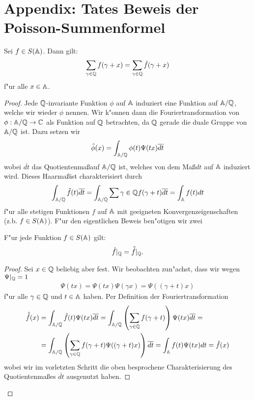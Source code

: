 \section{Appendix: Tates Beweis der Poisson-Summenformel}
\begin{satz}
		Sei $f \in S(\mathbb{A})$. Dann gilt:
		\begin{align}
			\sum_{\gamma \in \mathbb{Q}} {f(\gamma + x)} = \sum_{\gamma \in \mathbb{Q}}{\hat{f}(\gamma + x)}
		\end{align}
		f"ur alle $x \in \mathbb{A}$.
	\end{satz}
	\begin{proof}
		Jede $\mathbb{Q}$-invariante Funktion $\phi$ auf $\mathbb{A}$ induziert eine Funktion auf $\mathbb{A}/\mathbb{Q}$, welche wir wieder $\phi$ nennen.
		Wir k"onnen dann die Fouriertransformation von $\phi: \mathbb{A}/\mathbb{Q} \rightarrow \mathbb{C}$ als Funktion auf $\mathbb{Q}$ betrachten, da $\mathbb{Q}$ gerade die duale Gruppe von $\mathbb{A}/\mathbb{Q}$ ist. Dazu setzen wir
		\begin{align*}
			\hat{\phi}(x) = \int_{\mathbb{A}/\mathbb{Q}}\phi(t)\Psi(tx)\overline{dt}
		\end{align*}
		wobei $\overline{dt}$ das Quotientenma\ss auf $\mathbb{A}/\mathbb{Q}$ ist, welches von dem Ma\ss $dt$ auf $\mathbb{A}$ induziert wird. Dieses Haarma\ss ist charakterisiert durch
		\begin{align*}
			\int_{\mathbb{A}/\mathbb{Q}}\tilde{f}(t)\overline{dt} =
			\int_{\mathbb{A}/\mathbb{Q}}\sum{\gamma \in \mathbb{Q}}f(\gamma+t)\overline{dt} =
			\int_{\mathbb{A}} f(t)dt
		\end{align*}
		f"ur alle stetigen Funktionen $f$ auf $\mathbb{A}$ mit geeigneten Konvergenzeigenschaften (z.b. $f\in S(\mathbb{A})$). F"ur den eigentlichen Beweis ben"otigen wir zwei
		
		\begin{lemma}
			F"ur jede Funktion $f \in S(\mathbb{A})$ gilt:
			\begin{align*}
				\hat{f}|_{\mathbb{Q}} = \hat{\tilde{f}}|_{\mathbb{Q}}.
			\end{align*}
		\end{lemma}
		\begin{proof}
			Sei $x \in \mathbb{Q}$ beliebig aber fest. Wir beobachten zun"achst, dass wir wegen $\Psi|_{\mathbb{Q}} =1$
			\begin{align*}
				\Psi(tx)= \Psi(tx)\Psi(\gamma x)=\Psi((\gamma + t) x)
			\end{align*}
			f"ur alle $\gamma \in \mathbb{Q}$ und $t\in \mathbb{A}$ haben. Per Definition der Fouriertransformation
			\begin{align*}
				\hat{\tilde{f}}(x)	&= \int_{\mathbb{A} / \mathbb{Q}} {\hat{f}(t)\Psi(tx)\overline{dt}} 
									 = \int_{\mathbb{A} / \mathbb{Q}} \left(\sum_{\gamma \in \mathbb{Q}}{f(\gamma + t)}\right)\Psi(tx)\overline{dt} =\\
									&= \int_{\mathbb{A} / \mathbb{Q}} \left(\sum_{\gamma \in \mathbb{Q}}{f(\gamma + t)}\Psi((\gamma + t)x)\right)\overline{dt}
									 = \int_{\mathbb{A}} f(t)\Psi(tx)dt = \hat{f}(x)
			\end{align*}
			wobei wir im vorletzten Schritt die oben besprochene Charakterisierung des Quotientenmaßes $\overline{dt}$ ausgenutzt haben.
		\end{proof}
		

\end{proof}
